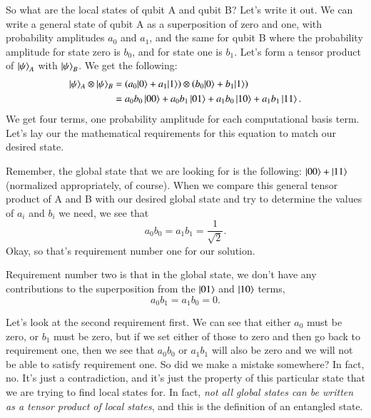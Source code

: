 So what are the local states of qubit A and qubit B? Let's write it out. We can write a general state of qubit A as a superposition of zero and one, with probability amplitudes $a_0$ and $a_1$, and the same for qubit B where the probability amplitude for state zero is $b_0$, and for state one is $b_1$. 
Let's form a tensor product of $\left| \psi \right\rangle_A$ with $\left| \psi \right\rangle_B$. We get the following: 
\begin{equation}
\begin{aligned}
|\psi\rangle_{A} \otimes|\psi\rangle_{B} &= \left(a_{0}|0\rangle+a_{1}|1\rangle\right) \otimes\left(b_{0}|0\rangle+b_{1}|1\rangle\right) \\
 &= a_0 b_0\left| 00 \right\rangle + a_0 b_1\left| 01 \right\rangle + a_1 b_0\left| 10 \right\rangle + a_1 b_1\left| 11 \right\rangle.
\end{aligned}
\end{equation}
We get four terms, one probability amplitude for each computational basis term. Let's lay our the mathematical requirements for this equation to match our desired state.

Remember, the global state that we are looking for is the following: $\left| 00 \right\rangle+\left| 11 \right\rangle$ (normalized appropriately, of course). 
When we compare this general tensor product of A and B with our desired global state and try to determine the values of $a_i$ and $b_i$ we need, we see that
\begin{equation}
a_{0} b_{0}=a_{1} b_{1}=\frac{1}{\sqrt{2}}.
\end{equation}
Okay, so that's requirement number one for our solution.

Requirement number two is that in the global state, we don't have any contributions to the superposition from the $\left| 01 \right\rangle$ and $\left| 10 \right\rangle$ terms,
\begin{equation}
a_0 b_1 = a_1 b_0 = 0.    
\end{equation}

Let's look at the second requirement first. We can see that either $a_0$ must be zero, or $b_1$ must be zero, but if we set either of those to zero and then go back to requirement one, then we see that $a_0 b_0$ or $a_1 b_1$ will also be zero and we will not be able to satisfy requirement one.
So did we make a mistake somewhere? In fact, no. It's just a contradiction, and it's just the property of this particular state that we are trying to find local states for. In fact, \emph{not all global states can be written as a tensor product of local states}, and this is the definition of an entangled state.

